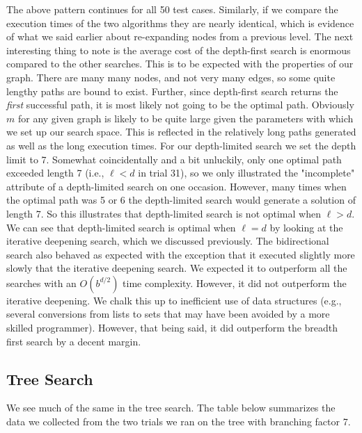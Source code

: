 \documentclass[a4paper,11pt]{report}
\begin{document}
The above pattern continues for all 50 test cases. Similarly, if we compare the
execution times of the two algorithms they are nearly identical, which is 
evidence of what we said earlier about re-expanding nodes from a previous
level.\newline
\indent The next interesting thing to note is the average cost of the
depth-first search is enormous compared to the other searches.  This is to be
expected with the properties of our graph.  There are many many nodes, and not
very many edges, so some quite lengthy paths are bound to exist.  Further,
since depth-first search returns the \textit{first} successful path, it is most
likely not going to be the optimal path.  Obviously $m$ for any given graph is
likely to be quite large given the parameters with which we set up our search
space.  This is reflected in the relatively long paths generated as well as the
long execution times.\newline 
\indent For our depth-limited search we set the depth limit to 7.  Somewhat
coincidentally and a bit unluckily, only one optimal path exceeded length 7
(i.e., $\ell < d$ in trial 31), so we only illustrated the "incomplete"
attribute of a depth-limited search on one occasion. However, many times when
the optimal path was 5 or 6 the depth-limited search would generate a solution
of length 7.  So this illustrates that depth-limited search is not optimal when
$\ell > d$. We can see that depth-limited search is optimal when $\ell = d$ by
looking at the iterative deepening search, which we discussed
previously.\newline 
\indent The bidirectional search also behaved as expected with the exception
that it executed slightly more slowly that the iterative deepening search. We
expected it to outperform all the searches with an $O(b^{d / 2})$ time
complexity.  However, it did not outperform the iterative deepening.  We chalk
this up to inefficient use of data structures (e.g., several conversions from
lists to sets that may have been avoided by a more skilled programmer).
However, that being said, it did outperform the breadth first search by a
decent margin.

\subsection{Tree Search}
We see much of the same in the tree search.  The table below summarizes the
data we collected from the two trials we ran on the tree with branching factor
7.\vspace{5 mm}
\end{document}
